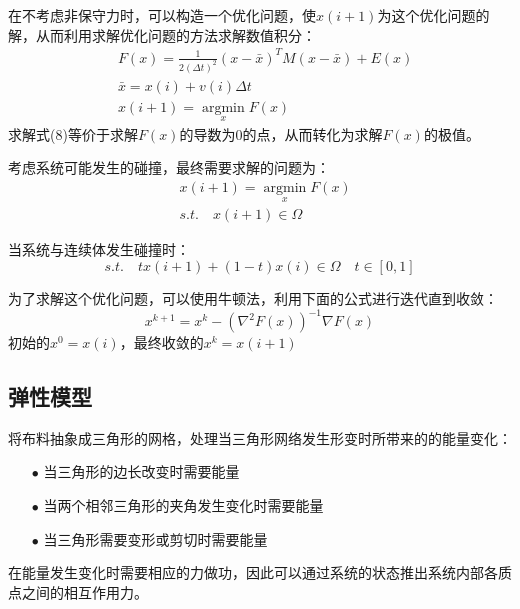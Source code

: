 \documentclass{CLGPY}
\begin{document}
\begin{multicols}{2}
		在不考虑非保守力时，可以构造一个优化问题，使$x(i+1)$为这个优化问题的解，从而利用求解优化问题的方法求解数值积分：
		\begin{equation}
		\begin{split}
			&F(x)=\frac{1}{2(\Delta t)^2}(x-\bar x)^TM(x-\bar x)+E(x)\\
			&\bar x=x(i)+v(i)\Delta t\\
			&x(i+1) = \mathop{argmin}\limits_xF(x)
		\end{split}
		\end{equation}
		求解式(8)等价于求解$F(x)$的导数为0的点，从而转化为求解$F(x)$的极值。

		考虑系统可能发生的碰撞，最终需要求解的问题为：
		\begin{equation}
		\begin{split}
			&x(i+1) = \mathop{argmin}\limits_xF(x)\\
			&s.t. \quad x(i+1) \in  \Omega
		\end{split}
		\end{equation}

		当系统与连续体发生碰撞时：
        \begin{equation}
			s.t. \quad tx(i+1) +(1-t)x(i) \in  \Omega \quad t\in[0,1]
        \end{equation}

		为了求解这个优化问题，可以使用牛顿法，利用下面的公式进行迭代直到收敛：
        \begin{equation}
			x^{k+1} = x^{k}-(\nabla ^2F(x))^{-1}\nabla F(x)
        \end{equation}
		初始的$x^0=x(i)$，最终收敛的$x^{k}=x(i+1)$

		\subsection{弹性模型}
		将布料抽象成三角形的网格，处理当三角形网络发生形变时所带来的的能量变化：

		\begin{itemize}
			\item[$\bullet$] 当三角形的边长改变时需要能量
			\item[$\bullet$] 当两个相邻三角形的夹角发生变化时需要能量
			\item[$\bullet$] 当三角形需要变形或剪切时需要能量
		\end{itemize}

		在能量发生变化时需要相应的力做功，因此可以通过系统的状态推出系统内部各质点之间的相互作用力。


\end{multicols}
\end{document}
